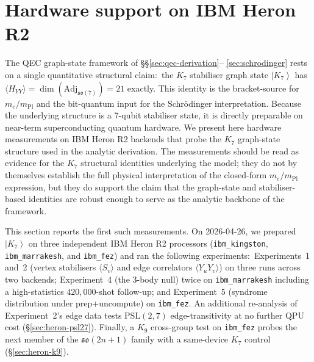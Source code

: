 \documentclass[11pt]{article}
\newcommand{\so}{\mathfrak{so}}
\newcommand{\Adj}{\mathrm{Adj}}
\newcommand{\ket}[1]{\left|#1\right\rangle}
\newcommand{\mPl}{m_{\mathrm{Pl}}}
\begin{document}
\section{Hardware support on IBM Heron R2}
\label{sec:heron-experiment}

The QEC graph-state framework of \S\S\ref{sec:qec-derivation}--%
\ref{sec:schrodinger} rests on a single quantitative structural claim:\
the $K_7$ stabiliser graph state $\ket{K_7}$ has
$\langle H_{YY}\rangle = \dim(\Adj_{\so(7)}) = 21$ exactly.  This
identity is the bracket-source for $m_e/\mPl$ and the bit-quantum
input for the Schr\"odinger interpretation.  Because the underlying
structure is a 7-qubit stabiliser state, it is directly preparable
on near-term superconducting quantum hardware.  We present here
hardware measurements on IBM Heron R2 backends that probe the $K_7$
graph-state structure used in the analytic derivation.  The
measurements should be read as evidence for the $K_7$ structural
identities underlying the model; they do not by themselves
establish the full physical interpretation of the closed-form
$m_e/\mPl$ expression, but they do support the claim that the
graph-state and stabiliser-based identities are robust enough to
serve as the analytic backbone of the framework.

This section reports the first such measurements.  On
2026-04-26, we prepared $\ket{K_7}$ on three independent IBM Heron R2
processors (\texttt{ibm\_kingston}, \texttt{ibm\_marrakesh}, and
\texttt{ibm\_fez}) and ran the following experiments:\
Experiments~1 and~2 (vertex stabilisers $\langle S_v\rangle$ and
edge correlators $\langle Y_u Y_v\rangle$) on three runs across
two backends; Experiment~4 (the 3-body null) twice on
\texttt{ibm\_marrakesh} including a high-statistics
$420{,}000$-shot follow-up; and Experiment~5 (syndrome
distribution under prep+uncompute) on \texttt{ibm\_fez}.  An
additional re-analysis of Experiment~2's edge data tests
$\mathrm{PSL}(2,7)$ edge-transitivity at no further QPU cost
(\S\ref{sec:heron-psl27}).  Finally, a $K_9$ cross-group test on
\texttt{ibm\_fez} probes the next member of the $\so(2n+1)$ family
with a same-device $K_7$ control (\S\ref{sec:heron-k9}).
\end{document}
